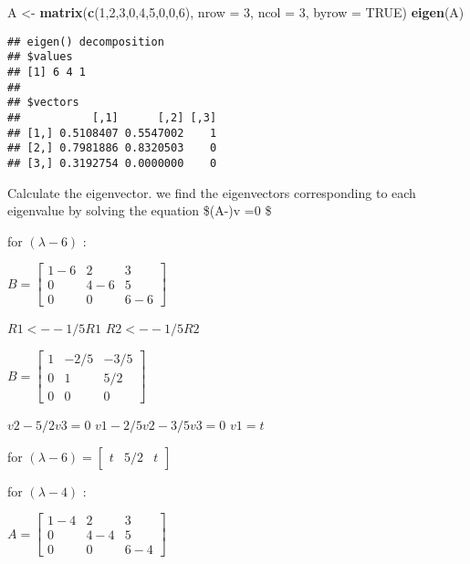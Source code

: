 \documentclass[
]{article}
\newenvironment{Shaded}{\begin{snugshade}}{\end{snugshade}}
\newcommand{\AttributeTok}[1]{\textcolor[rgb]{0.13,0.29,0.53}{#1}}
\newcommand{\ConstantTok}[1]{\textcolor[rgb]{0.56,0.35,0.01}{#1}}
\newcommand{\DecValTok}[1]{\textcolor[rgb]{0.00,0.00,0.81}{#1}}
\newcommand{\FunctionTok}[1]{\textcolor[rgb]{0.13,0.29,0.53}{\textbf{#1}}}
\newcommand{\NormalTok}[1]{#1}
\newcommand{\OtherTok}[1]{\textcolor[rgb]{0.56,0.35,0.01}{#1}}
\begin{document}
\begin{Shaded}
\begin{Highlighting}[]
\NormalTok{A }\OtherTok{\textless{}{-}} \FunctionTok{matrix}\NormalTok{(}\FunctionTok{c}\NormalTok{(}\DecValTok{1}\NormalTok{,}\DecValTok{2}\NormalTok{,}\DecValTok{3}\NormalTok{,}\DecValTok{0}\NormalTok{,}\DecValTok{4}\NormalTok{,}\DecValTok{5}\NormalTok{,}\DecValTok{0}\NormalTok{,}\DecValTok{0}\NormalTok{,}\DecValTok{6}\NormalTok{), }\AttributeTok{nrow =} \DecValTok{3}\NormalTok{, }\AttributeTok{ncol =} \DecValTok{3}\NormalTok{, }\AttributeTok{byrow =} \ConstantTok{TRUE}\NormalTok{)}
\FunctionTok{eigen}\NormalTok{(A)}
\end{Highlighting}
\end{Shaded}

\begin{verbatim}
## eigen() decomposition
## $values
## [1] 6 4 1
## 
## $vectors
##           [,1]      [,2] [,3]
## [1,] 0.5108407 0.5547002    1
## [2,] 0.7981886 0.8320503    0
## [3,] 0.3192754 0.0000000    0
\end{verbatim}

Calculate the eigenvector. we find the eigenvectors corresponding to
each eigenvalue by solving the equation \$(A-\lambda)v =0 \$

for \((\lambda - 6)\) :

\(B = \begin{bmatrix}1-6 & 2 & 3\\ 0 &4-6 & 5 \\ 0 & 0 & 6-6 \end{bmatrix}\)

\(R1 <- -1/5R1\) \(R2 <- -1/5R2\)

\(B = \begin{bmatrix}1 & -2/5 & -3/5\\ 0 &1 & 5/2 \\ 0 & 0 & 0 \end{bmatrix}\)

\(v2 - 5/2v3 = 0\) \(v1 - 2/5v2-3/5v3 = 0\) \(v1 = t\)

for \((\lambda - 6) = \begin{bmatrix}t & 5/2 & t \end{bmatrix}\)

for \((\lambda - 4)\) :

\(A = \begin{bmatrix}1-4 & 2 & 3\\ 0 &4-4 & 5 \\ 0 & 0 & 6-4 \end{bmatrix}\)
\end{document}
